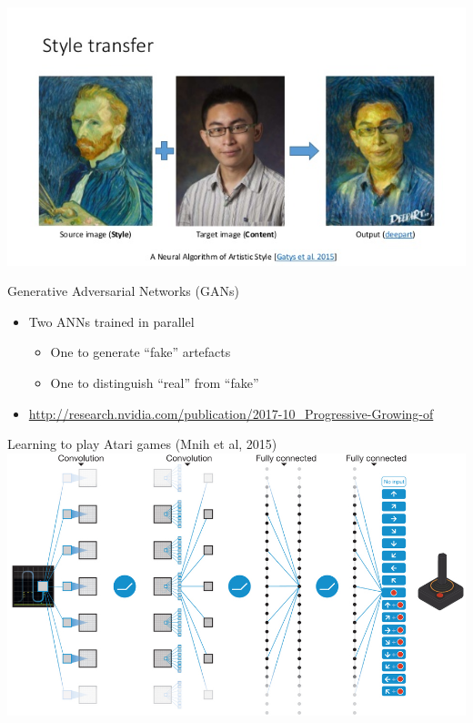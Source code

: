 \begin{frame}
	\includegraphics[width=\textwidth]{style_transfer}
\end{frame}

\begin{frame}{Generative Adversarial Networks (GANs)}
	\begin{itemize}
		\pause\item Two ANNs trained in parallel
			\begin{itemize}
				\pause\item One to generate ``fake'' artefacts
				\pause\item One to distinguish ``real'' from ``fake''
			\end{itemize}
		\pause\item \url{http://research.nvidia.com/publication/2017-10_Progressive-Growing-of}
	\end{itemize}
\end{frame}

\begin{frame}{Learning to play Atari games (Mnih et al, 2015)}
	\includegraphics[width=\textwidth]{deepmind_atari}
\end{frame}

